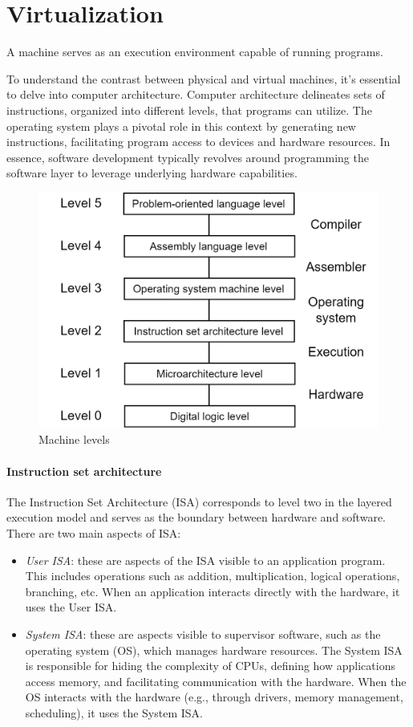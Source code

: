 \section{Virtualization}

\begin{definition}
    A machine serves as an execution environment capable of running programs.
\end{definition}
To understand the contrast between physical and virtual machines, it's essential to delve into computer architecture.
Computer architecture delineates sets of instructions, organized into different levels, that programs can utilize. 
The operating system plays a pivotal role in this context by generating new instructions, facilitating program access to devices and hardware resources.
In essence, software development typically revolves around programming the software layer to leverage underlying hardware capabilities.
\begin{figure}[H]
    \centering
    \includegraphics[width=0.5\linewidth]{images/lev.png}
    \caption{Machine levels}
\end{figure}

\paragraph*{Instruction set architecture}
The Instruction Set Architecture (ISA) corresponds to level two in the layered execution model and serves as the boundary between hardware and software.
There are two main aspects of ISA:
\begin{itemize}
    \item \textit{User ISA}: these are aspects of the ISA visible to an application program. 
        This includes operations such as addition, multiplication, logical operations, branching, etc. When an application interacts directly with the hardware, it uses the User ISA.
    \item \textit{System ISA}: these are aspects visible to supervisor software, such as the operating system (OS), which manages hardware resources. 
        The System ISA is responsible for hiding the complexity of CPUs, defining how applications access memory, and facilitating communication with the hardware. 
        When the OS interacts with the hardware (e.g., through drivers, memory management, scheduling), it uses the System ISA.
\end{itemize}

